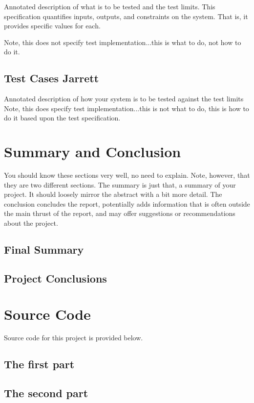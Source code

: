 \documentclass[12pt]{article} %
\begin{document}
Annotated description of what is to be tested and the test limits.  This specification quantifies inputs, outputs, and constraints on the system.  That is, it provides specific values for each. 

Note, this does not specify test implementation...this is what to do, not how to do it.

\subsection{Test Cases  Jarrett}

Annotated description of how your system is to be tested against the test limits
Note, this does specify test implementation...this is not what to do, this is how to do it based upon the test specification.

\section{Summary and Conclusion}

You should know these sections very well, no need to explain.  Note, however, that they are two different sections.  The summary is just that, a summary of your project.  It should loosely mirror the abstract with a bit more detail.  The conclusion concludes the report, potentially adds information that is often outside the main thrust of the report, and may offer suggestions or recommendations about the project.

\subsection{Final Summary}


\subsection{Project Conclusions}


\pagebreak
\appendix

\section{Source Code}

Source code for this project is provided below.

\subsection{The first part}
% 

\subsection{The second part}
% 
\end{document}
